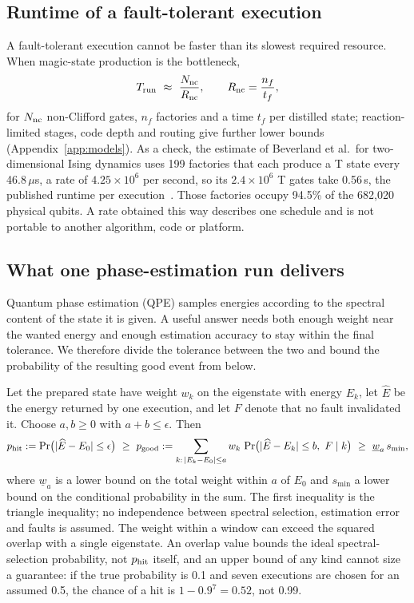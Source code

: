 \documentclass[10pt,a4paper]{article}
\begin{document}
\subsection{Runtime of a fault-tolerant execution}
A fault-tolerant execution cannot be faster than its slowest required resource. When magic-state production is the bottleneck,
\begin{equation}
T_{\rm run}\ \approx\ \frac{N_{\rm nc}}{R_{\rm nc}},\qquad R_{\rm nc}=\frac{n_f}{t_f},
\label{eq:tq}
\end{equation}
for $N_{\rm nc}$ non-Clifford gates, $n_f$ factories and a time $t_f$ per distilled state; reaction-limited stages, code depth and routing give further lower bounds (Appendix~\ref{app:models}). As a check, the estimate of Beverland et al.\ for two-dimensional Ising dynamics uses 199 factories that each produce a T state every 46.8\,$\mu$s, a rate of $4.25\times10^6$ per second, so its $2.4\times10^6$ T gates take 0.56\,s, the published runtime per execution~\cite{beverland2022,beverland_qualtran}. Those factories occupy 94.5\% of the 682{,}020 physical qubits. A rate obtained this way describes one schedule and is not portable to another algorithm, code or platform.

\subsection{What one phase-estimation run delivers}
\label{sec:qpe}
Quantum phase estimation (QPE) samples energies according to the spectral content of the state it is given. A useful answer needs both enough weight near the wanted energy and enough estimation accuracy to stay within the final tolerance. We therefore divide the tolerance between the two and bound the probability of the resulting good event from below.

Let the prepared state have weight $w_k$ on the eigenstate with energy $E_k$, let $\widehat E$ be the energy returned by one execution, and let $F$ denote that no fault invalidated it. Choose $a,b\ge0$ with $a+b\le\epsilon$. Then
\begin{equation}
p_{\rm hit}:=\Pr\bigl(|\widehat E-E_0|\le\epsilon\bigr)\ \ge\ p_{\rm good}:=\sum_{k:\,|E_k-E_0|\le a}w_k\,\Pr\bigl(|\widehat E-E_k|\le b,\ F\mid k\bigr)\ \ge\ \underline w_a\,s_{\min},
\label{eq:phit}
\end{equation}
where $\underline w_a$ is a lower bound on the total weight within $a$ of $E_0$ and $s_{\min}$ a lower bound on the conditional probability in the sum. The first inequality is the triangle inequality; no independence between spectral selection, estimation error and faults is assumed. The weight within a window can exceed the squared overlap with a single eigenstate. An overlap value bounds the ideal spectral-selection probability, not $p_{\rm hit}$ itself, and an upper bound of any kind cannot size a guarantee: if the true probability is 0.1 and seven executions are chosen for an assumed 0.5, the chance of a hit is $1-0.9^7=0.52$, not 0.99.
\end{document}

